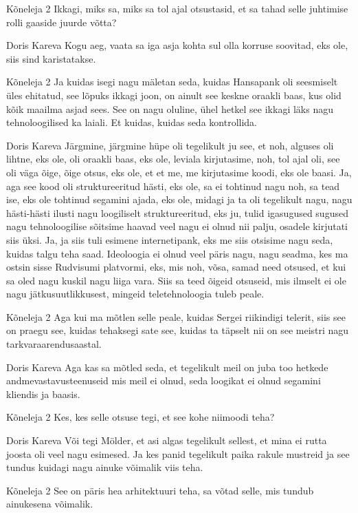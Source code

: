 Kõneleja 2
Ikkagi, miks sa, miks sa tol ajal otsustasid, et sa tahad selle juhtimise rolli gaaside juurde võtta? 

Doris Kareva
Kogu aeg, vaata sa iga asja kohta sul olla korruse soovitad, eks ole, siis sind karistatakse. 

Kõneleja 2
Ja kuidas isegi nagu mäletan seda, kuidas Hansapank oli seesmiselt üles ehitatud, see lõpuks ikkagi joon, on ainult see keskne oraakli baas, kus olid kõik maailma asjad sees. See on nagu oluline, ühel hetkel see ikkagi läks nagu tehnoloogilised ka laiali. Et kuidas, kuidas seda kontrollida. 

Doris Kareva
Järgmine, järgmine hüpe oli tegelikult ju see, et noh, alguses oli lihtne, eks ole, oli oraakli baas, eks ole, leviala kirjutasime, noh, tol ajal oli, see oli väga õige, õige otsus, eks ole, et et me, me kirjutasime koodi, eks ole baasi. Ja, aga see kood oli struktureeritud hästi, eks ole, sa ei tohtinud nagu noh, sa tead ise, eks ole tohtinud segamini ajada, eks ole, midagi ja ta oli tegelikult nagu, nagu hästi-hästi ilusti nagu loogiliselt struktureeritud, eks ju, tulid igasugused sugused nagu tehnoloogilise sõitsime haavad veel nagu ei olnud nii palju, osadele kirjutati siis üksi. Ja, ja siis tuli esimene internetipank, eks me siis otsisime nagu seda, kuidas talgu teha saad. Ideoloogia ei olnud veel päris nagu, nagu seadma, kes ma ostsin sisse Rudvisumi platvormi, eks, mis noh, võsa, samad need otsused, et kui sa oled nagu kuskil nagu liiga vara. Siis sa teed õigeid otsuseid, mis ilmselt ei ole nagu jätkusuutlikkusest, mingeid teletehnoloogia tuleb peale. 

Kõneleja 2
Aga kui ma mõtlen selle peale, kuidas Sergei riikindigi telerit, siis see on praegu see, kuidas tehaksegi sate see, kuidas ta täpselt nii on see meistri nagu tarkvaraarendusaastal. 

Doris Kareva
Aga kas sa mõtled seda, et tegelikult meil on juba too hetkede andmevastavusteenuseid mis meil ei olnud, seda loogikat ei olnud segamini kliendis ja baasis. 

Kõneleja 2
Kes, kes selle otsuse tegi, et see kohe niimoodi teha? 

Doris Kareva
Või tegi Mölder, et asi algas tegelikult sellest, et mina ei rutta joosta oli veel nagu esimesed. Ja kes panid tegelikult paika rakule mustreid ja see tundus kuidagi nagu ainuke võimalik viis teha. 

Kõneleja 2
See on päris hea arhitektuuri teha, sa võtad selle, mis tundub ainukesena võimalik. 

